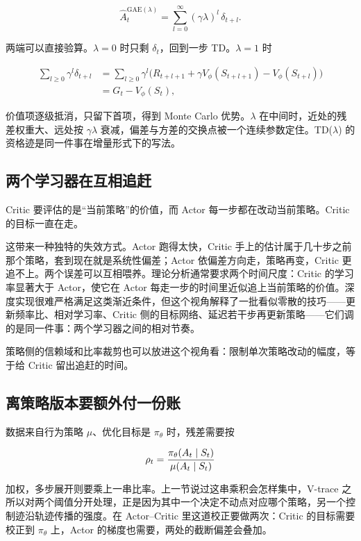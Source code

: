 \[
\widehat A_t^{\mathrm{GAE}(\lambda)}=\sum_{l=0}^{\infty}(\gamma\lambda)^l\,\delta_{t+l}.
\]

两端可以直接验算。\(\lambda=0\) 时只剩 \(\delta_t\)，回到一步 TD。\(\lambda=1\) 时

\[
\begin{aligned}
\sum_{l\ge0}\gamma^l\delta_{t+l}
&=\sum_{l\ge0}\gamma^l\big(R_{t+l+1}+\gamma V_\phi(S_{t+l+1})-V_\phi(S_{t+l})\big)\\
&=G_t-V_\phi(S_t),
\end{aligned}
\]

价值项逐级抵消，只留下首项，得到 Monte Carlo 优势。\(\lambda\) 在中间时，近处的残差权重大、远处按 \(\gamma\lambda\) 衰减，偏差与方差的交换点被一个连续参数定住。TD(\(\lambda\)) 的资格迹是同一件事在增量形式下的写法。

\subsection{两个学习器在互相追赶}

Critic 要评估的是``当前策略''的价值，而 Actor 每一步都在改动当前策略。Critic 的目标一直在走。

这带来一种独特的失效方式。Actor 跑得太快，Critic 手上的估计属于几十步之前那个策略，套到现在就是系统性偏差；Actor 依偏差方向走，策略再变，Critic 更追不上。两个误差可以互相喂养。理论分析通常要求两个时间尺度：Critic 的学习率显著大于 Actor，使它在 Actor 每走一步的时间里近似追上当前策略的价值。深度实现很难严格满足这类渐近条件，但这个视角解释了一批看似零散的技巧——更新频率比、相对学习率、Critic 侧的目标网络、延迟若干步再更新策略——它们调的是同一件事：两个学习器之间的相对节奏。

策略侧的信赖域和比率裁剪也可以放进这个视角看：限制单次策略改动的幅度，等于给 Critic 留出追赶的时间。

\subsection{离策略版本要额外付一份账}

数据来自行为策略 \(\mu\)、优化目标是 \(\pi_\theta\) 时，残差需要按

\[
\rho_t=\frac{\pi_\theta(A_t\mid S_t)}{\mu(A_t\mid S_t)}
\]

加权，多步展开则要乘上一串比率。上一节说过这串乘积会怎样集中，V-trace 之所以对两个阈值分开处理，正是因为其中一个决定不动点对应哪个策略，另一个控制迹沿轨迹传播的强度。在 Actor--Critic 里这道校正要做两次：Critic 的目标需要校正到 \(\pi_\theta\) 上，Actor 的梯度也需要，两处的截断偏差会叠加。

